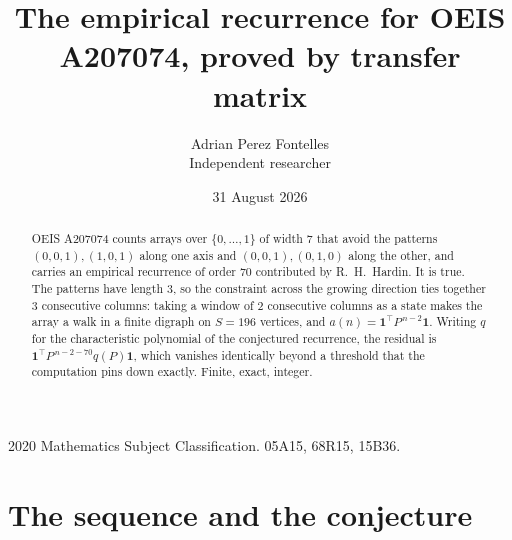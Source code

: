 \documentclass[11pt,a4paper]{article}
\title{The empirical recurrence for OEIS A207074, proved by transfer matrix}
\author{Adrian Perez Fontelles\\ \small Independent researcher}
\date{31 August 2026}
\theoremstyle{plain}
\theoremstyle{definition}
\begin{document}
\maketitle

\begin{abstract}
OEIS A207074 counts arrays over $\{0,\dots,1\}$ of width $7$ that avoid the patterns
$(0,0,1), (1,0,1)$ along one axis and $(0,0,1), (0,1,0)$ along the other, and carries an empirical recurrence of
order $70$ contributed by R.~H.~Hardin. It is true. The patterns have length $3$, so
the constraint across the growing direction ties together $3$ consecutive columns: taking a
window of $2$ consecutive columns as a state makes the array a walk in a finite digraph
on $S=196$ vertices, and $a(n)=\mathbf{1}^{\!\top}P^{\,n-2}\mathbf{1}$. Writing $q$
for the characteristic polynomial of the conjectured recurrence, the residual is
$\mathbf{1}^{\!\top}P^{\,n-2-70}q(P)\mathbf{1}$, which vanishes identically
beyond a threshold that the computation pins down exactly. Finite, exact, integer.
\end{abstract}

\noindent\small 2020 Mathematics Subject Classification. 05A15, 68R15, 15B36.\normalsize

\section{The sequence and the conjecture}
\end{document}
